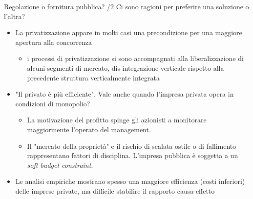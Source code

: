 \documentclass[aspectratio=64,11pt]{beamer}
\begin{document}
\begin{frame}{Regolazione o fornitura pubblica? /2}
Ci sono ragioni per preferire una soluzione o l'altra?
\begin{itemize}
\item La privatizzazione appare in molti casi una precondizione per una maggiore
apertura alla concorrenza
\begin{itemize}
\item i processi di privatizzazione si sono accompagnati alla liberalizzazione
di alcuni segmenti di mercato, dis-integrazione verticale rispetto alla
precedente struttura verticalmente integrata
\end{itemize}
\item "Il privato è più efficiente". Vale anche quando l'impresa privata opera in
condizioni di monopolio?
\begin{itemize}
\item La motivazione del profitto spinge gli azionisti a monitorare maggiormente
l'operato del management.
\item Il "mercato della proprietà" e il rischio di scalata ostile o di
fallimento rappresentano fattori di disciplina. L'impresa pubblica è
soggetta a un \emph{soft budget constraint}.
\end{itemize}
\item Le analisi empiriche mostrano spesso una maggiore efficienza (costi
inferiori) delle imprese private, ma difficile stabilire il rapporto
causa-effetto
\end{itemize}
\end{frame}
\end{document}
